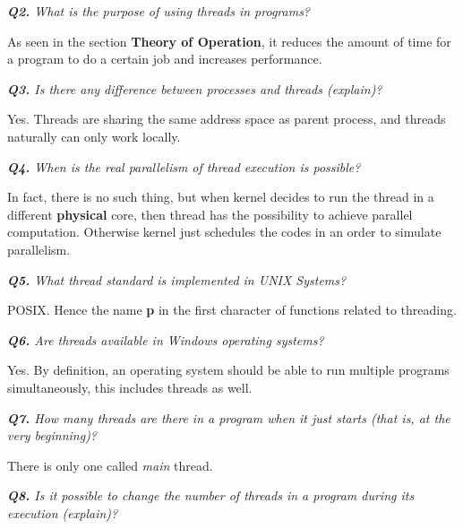 \documentclass[11pt]{article}
\begin{document}
\vspace{3mm}
\textit{\textbf{Q2.} What is the purpose of using threads in programs?}
\vspace{3mm}

As seen in the section \textbf{Theory of Operation}, it reduces the amount of time for a program to do a certain job and increases performance.

\vspace{5mm}
\textit{\textbf{Q3.} Is there any difference between processes and threads (explain)?}
\vspace{5mm}

Yes. Threads are sharing the same address space as parent process, and threads naturally can only work locally.

\vspace{5mm}
\textit{\textbf{Q4.} When is the real parallelism of thread execution is possible?}
\vspace{5mm}

In fact, there is no such thing, but when kernel decides to run the thread in a different \textbf{physical} core, then thread has the possibility to achieve parallel computation. Otherwise kernel just schedules the codes in an order to simulate parallelism.

\vspace{5mm}
\textit{\textbf{Q5.} What thread standard is implemented in UNIX Systems?}
\vspace{5mm}

POSIX. Hence the name \textbf{p} in the first character of functions related to threading.

\vspace{5mm}
\textit{\textbf{Q6.} Are threads available in Windows operating systems?}
\vspace{5mm}

Yes. By definition, an operating system should be able to run multiple programs simultaneously, this includes threads as well.

\vspace{5mm}
\textit{\textbf{Q7.} How many threads are there in a program when it just starts (that is, at the very beginning)?}
\vspace{5mm}

There is only one called \textit{main} thread.

\vspace{5mm}
\textit{\textbf{Q8.} Is it possible to change the number of threads in a program during its execution (explain)?}
\vspace{5mm}
\end{document}
